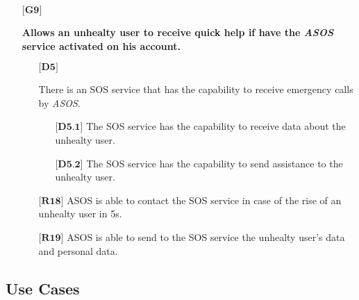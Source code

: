 \begin{itemize}
	\item[${\textbf{[G9]}}$] {\textbf{Allows an unhealty user to receive quick help if have the \hbox{\emph{ASOS}} service activated on his account.}
		\begin{itemize}
			\item[$\textbf{[D5]}$] {There is an SOS service that has the capability to receive emergency calls by \hbox{\emph{ASOS}}.
				\begin{itemize}
					\item[$\textbf{[D5.1]}$] {The SOS service has the capability to receive data about the unhealty user.}
					\item[$\textbf{[D5.2]}$] {The SOS service has the capability to send assistance to the unhealty user.}
				\end{itemize}}
			\item[$\textbf{[R18]}$] {ASOS is able to contact the SOS service in case of the rise of an unhealty user in 5s.}
			\item[$\textbf{[R19]}$] {ASOS is able to send to the SOS service the unhealty user's data and personal data.}
		\end{itemize}}
\end{itemize}

\subsection{Use Cases}
